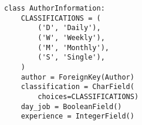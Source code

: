 \begin{lstlisting}[caption=Extension to database schema,label=lst-extension,frame=single]
class AuthorInformation:
    CLASSIFICATIONS = (
        ('D', 'Daily'),
        ('W', 'Weekly'),
        ('M', 'Monthly'),
        ('S', 'Single'),
    )
    author = ForeignKey(Author)
    classification = CharField(
        choices=CLASSIFICATIONS)
    day_job = BooleanField()
    experience = IntegerField()    
\end{lstlisting}


